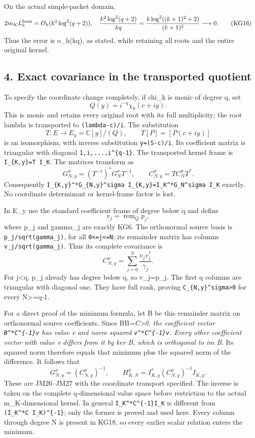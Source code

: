 \documentclass[11pt]{article}
\begin{document}
On the actual simple-packet domain, \[
2m_KL_k^{\rm form}=O_h(k^2\log^2(q+2)),\quad
\frac{k^2\log^2(q+2)}{kq}
=\frac{k\log^2((k+1)^2+2)}{(k+1)^2}\longrightarrow0.
\tag{KG16}
\] Thus the error is o\_h(kq), as stated, while retaining all roots and the entire original kernel.

\subsection{4. Exact covariance in the transported quotient}\label{mrkg:exact-covariance-in-the-transported-quotient}

To specify the coordinate change completely, if chi\_k is monic of degree q, set \[
Q(y)=i^{-q}\chi_k(c+iy).
\] This is monic and retains every original root with its full multiplicity; the root lambda is transported to \texttt{(lambda-c)/i}. The substitution \[
T:E\longrightarrow E_y=\mathbb C[y]/(Q),\qquad
T[P]=[P(c+iy)]
\tag{KG17}
\] is an isomorphism, with inverse substitution \texttt{y=(S-c)/i}. Its coefficient matrix is triangular with diagonal \texttt{1,i,...,i\^{}\{q-1\}}. The transported kernel frame is \texttt{I\_\{K,y\}=T\ I\_K}. The matrices transform as \[
G_{N,y}^\sigma=(T^{-1})^*G_N^\sigma T^{-1},\qquad
C_{N,y}^\sigma=T C_N^\sigma T^*.
\] Consequently \texttt{I\_\{K,y\}\^{}*G\_\{N,y\}\^{}sigma\ I\_\{K,y\}=I\_K\^{}*G\_N\^{}sigma\ I\_K} exactly. No coordinate determinant or kernel-frame factor is lost.

In E\_y use the standard coefficient frame of degree below q and define \[
v_j=\operatorname{rem}_Qp_j,
\] where p\_j and gamma\_j are exactly KG6. The orthonormal source basis is \texttt{p\_j/sqrt(gamma\_j)}, for all \texttt{0\textless{}=j\textless{}=N}; its remainder matrix has columns \texttt{v\_j/sqrt(gamma\_j)}. Thus its complete covariance is \[
C_{N,y}^\sigma=\sum_{j=0}^N\frac{v_jv_j^*}{\gamma_j}.
\tag{KG18}
\] For j\textless q, p\_j already has degree below q, so v\_j=p\_j. The first q columns are triangular with diagonal one. They have full rank, proving \texttt{C\_\{N,y\}\^{}sigma\textgreater{}0} for every N\textgreater=q-1.

For a direct proof of the minimum formula, let B be this remainder matrix on orthonormal source coefficients. Since BB\emph{=C\textgreater0, the coefficient vector \texttt{B\^{}*C\^{}\{-1\}v} has value v and norm squared \texttt{v\^{}*C\^{}\{-1\}v}. Every other coefficient vector with value v differs from it by ker B, which is orthogonal to im B}. Its squared norm therefore equals that minimum plus the squared norm of the difference. It follows that \[
G_{N,y}^\sigma=(C_{N,y}^\sigma)^{-1},\qquad
\boxed{H_{K,N}^\sigma=I_{K,y}^*(C_{N,y}^\sigma)^{-1}I_{K,y}.}
\tag{KG19}
\] These are JM26--JM27 with the coordinate transport specified. The inverse is taken on the complete q-dimensional value space before restriction to the actual m\_K-dimensional kernel. In general \texttt{I\_K\^{}*C\^{}\{-1\}I\_K} is different from \texttt{(I\_K\^{}*C\ I\_K)\^{}\{-1\}}; only the former is proved and used here. Every column through degree N is present in KG18, so every earlier scalar relation enters the minimum.
\end{document}
